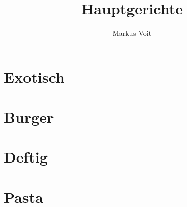 \documentclass[
  DIV=11,%
  pagesize,%
  fontsize=11pt,%
  paper=a4,%
  numbers=noenddot,
]{scrartcl}
\title{Hauptgerichte}
\author{Markus Voit}
\begin{document}
\maketitle

\tableofcontents
\clearpage

\section{Exotisch}
\newpage{}

\section{Burger}
\newpage{}

\section{Deftig}
\newpage{}
\newpage{}

\section{Pasta}
\newpage{}
\newpage{}
\end{document}
